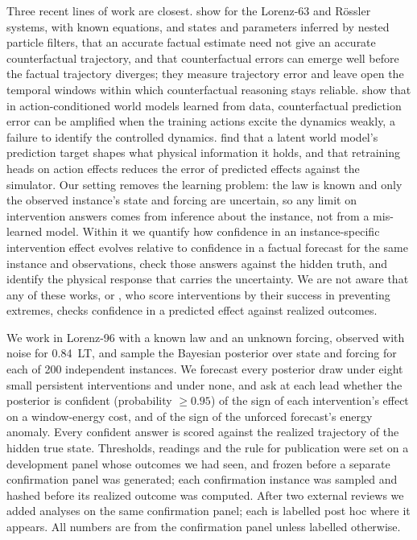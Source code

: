 \documentclass[11pt]{article}
\begin{document}
Three recent lines of work are closest. \citet{aalaila2026chaotic} show for the Lorenz-63 and R\"ossler systems, with known equations, and states and parameters inferred by nested particle filters, that an accurate factual estimate need not give an accurate counterfactual trajectory, and that counterfactual errors can emerge well before the factual trajectory diverges; they measure trajectory error and leave open the temporal windows within which counterfactual reasoning stays reliable. \citet{zhang2026identifiability} show that in action-conditioned world models learned from data, counterfactual prediction error can be amplified when the training actions excite the dynamics weakly, a failure to identify the controlled dynamics. \citet{tan2026latent} find that a latent world model's prediction target shapes what physical information it holds, and that retraining heads on action effects reduces the error of predicted effects against the simulator. Our setting removes the learning problem: the law is known and only the observed instance's state and forcing are uncertain, so any limit on intervention answers comes from inference about the instance, not from a mis-learned model. Within it we quantify how confidence in an instance-specific intervention effect evolves relative to confidence in a factual forecast for the same instance and observations, check those answers against the hidden truth, and identify the physical response that carries the uncertainty. We are not aware that any of these works, or \citet{mitsui2025bottomup}, who score interventions by their success in preventing extremes, checks confidence in a predicted effect against realized outcomes.

We work in Lorenz-96 \citep{lorenz1995predictability,lorenz2006predictability} with a known law and an unknown forcing, observed with noise for 0.84~LT, and sample the Bayesian posterior over state and forcing for each of 200 independent instances. We forecast every posterior draw under eight small persistent interventions and under none, and ask at each lead whether the posterior is confident (probability $\ge 0.95$) of the sign of each intervention's effect on a window-energy cost, and of the sign of the unforced forecast's energy anomaly. Every confident answer is scored against the realized trajectory of the hidden true state. Thresholds, readings and the rule for publication were set on a development panel whose outcomes we had seen, and frozen before a separate confirmation panel was generated; each confirmation instance was sampled and hashed before its realized outcome was computed. After two external reviews we added analyses on the same confirmation panel; each is labelled post hoc where it appears. All numbers are from the confirmation panel unless labelled otherwise.
\end{document}
